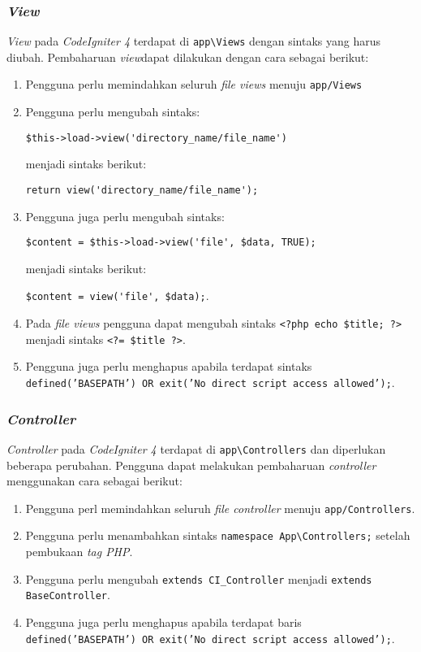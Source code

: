 \subsubsection{\textit{View}}
\textit{View} pada \textit{CodeIgniter 4} terdapat di \verb|app\Views| dengan sintaks yang harus diubah. Pembaharuan \textit{view}dapat dilakukan dengan cara sebagai berikut:
\begin{enumerate}
\item Pengguna perlu memindahkan seluruh \textit{file views} menuju \verb|app/Views|
\item Pengguna perlu mengubah sintaks:
\begin{center}
	\verb|$this->load->view('directory_name/file_name')|
\end{center}
menjadi sintaks berikut:
\begin{center}
	\verb|return view('directory_name/file_name');|
\end{center}
\item Pengguna juga perlu mengubah sintaks:
\begin{center}
	\verb|$content = $this->load->view('file', $data, TRUE);|
\end{center}	
	 menjadi sintaks berikut:
\begin{center}
	\verb|$content = view('file', $data);|.
\end{center}
\item Pada \textit{file views} pengguna dapat mengubah sintaks \verb|<?php echo $title; ?>| menjadi sintaks \verb|<?= $title ?>|.

\item Pengguna juga perlu menghapus apabila terdapat sintaks \texttt{defined('BASEPATH') OR exit('No direct script access allowed');}.
\end{enumerate}
 
\subsubsection{\textit{Controller}}
\textit{Controller} pada \textit{CodeIgniter 4} terdapat di \verb|app\Controllers| dan diperlukan beberapa perubahan. Pengguna dapat melakukan pembaharuan \textit{controller} menggunakan cara sebagai berikut:
\begin{enumerate}
\item Pengguna perl memindahkan seluruh \textit{file controller} menuju \verb|app/Controllers|.
\item Pengguna perlu menambahkan sintaks \verb|namespace App\Controllers;| setelah pembukaan \textit{tag PHP}.
\item Pengguna perlu mengubah \verb|extends CI_Controller| menjadi \verb|extends BaseController|.
\item Pengguna juga perlu menghapus apabila terdapat baris \texttt{defined('BASEPATH') OR exit('No direct script access allowed');}.
\end{enumerate}
 
